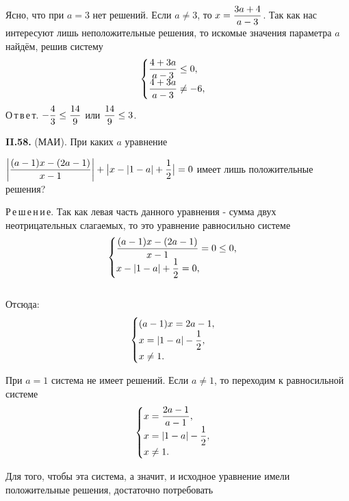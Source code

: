\documentclass{article}
\begin{document}
 
Ясно, что при $a = 3$ нет решений. Если $a \ne 3$, то $\displaystyle x = {{3a + 4}\over{a - 3}} $. Так как нас интересуют лишь неположительные решения, то искомые значения параметра $a$ найдём, решив систему
 \begin{equation*}
 \begin{cases}
  \displaystyle {{4 + 3a}\over{a - 3}} \leq 0, 
   \\
  \displaystyle  {{4 + 3a}\over{a - 3}} \ne -6,
 \end{cases}
\end{equation*}
О\,т\,в\,е\,т. $\displaystyle - {{4}\over{3}} \leq {{14}\over{9}}$ или $\displaystyle {{14}\over{9}} \leq 3$.
 
\textbf{II.58.} (МАИ). При каких $a$ уравнение
 
$\displaystyle    \bigg|{{(a - 1)x - (2a - 1)}\over{x - 1}}\bigg|  + \big|x - |1 - a|   + {{1}\over{2}}\big| = 0$  
имеет лишь положительные решения?
 
Р\,е\,ш\,е\,н\,и\,е. Так как левая часть данного уравнения  - сумма двух неотрицательных слагаемых, то это уравнение равносильно системе
 \begin{equation*}
 \begin{cases}
  \displaystyle {{(a - 1)x - (2a - 1)}\over{x - 1}} = 0 \leq 0, 
   \\
  \displaystyle  x - |1 - a| + {{1}\over{2}} = 0,
 \end{cases}
\end{equation*}
\\
Отсюда:
 \begin{equation*}
 \begin{cases}
  \displaystyle (a - 1)x = 2a - 1, 
   \\
  \displaystyle  x = |1 - a| - {{1}\over{2}},
  \\
  x \ne 1.
 \end{cases}
\end{equation*}
 
При $a = 1$ система не имеет решений. Если $a \ne 1$, то переходим к равносильной системе
 \begin{equation*}
 \begin{cases}
  \displaystyle x = {{2a - 1}\over{a - 1}}, 
   \\
  \displaystyle  x  = |1 - a| - {{1}\over{2}},
  \\
  x \ne 1.
 \end{cases}
\end{equation*}
 
Для того, чтобы эта система, а значит, и исходное уравнение имели положительные решения, достаточно потребовать
 
 
  
  
\end{document}
